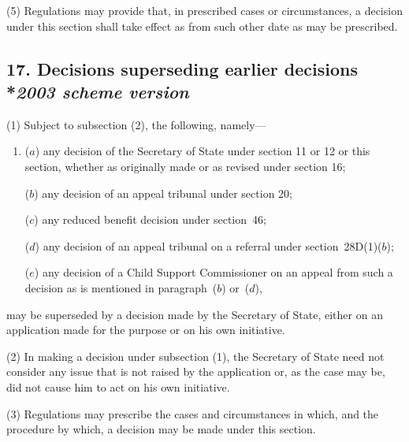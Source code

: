 \documentclass[12pt,a4paper]{article}
\begin{document}
(5) Regulations may provide that, in prescribed cases or circumstances, a decision under this section shall take effect as from such other date as may be prescribed.


\subsection[17. Decisions superseding earlier decisions --- \emph{2003 scheme version}]{17. Decisions superseding earlier decisions\\*\emph{2003 scheme version}}

(1) Subject to subsection (2), the following, namely—
\begin{enumerate}\item[]
($a$) any decision of the Secretary of State under section 11 or 12 or this section, whether as originally made or as revised under section 16;

($b$) any decision of an appeal tribunal under section 20; 


($c$) any reduced benefit decision under section~46;

\begin{sloppypar}
($d$) any decision of an appeal tribunal on a referral under section~28D(1)($b$);
\end{sloppypar}

($e$) any decision of a Child Support Commissioner on an appeal from such a decision as is mentioned in paragraph~($b$)  or~($d$),
\end{enumerate}
may be superseded by a decision made by the Secretary of State, either on an application made for the purpose or on his own initiative.

(2) In making a decision under subsection (1), the Secretary of State need not consider any issue that is not raised by the application or, as the case may be, did not cause him to act on his own initiative.

(3) Regulations may prescribe the cases and circumstances in which, and the procedure by which, a decision may be made under this section.

\end{document}
